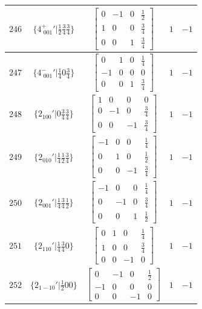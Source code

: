 \documentclass[fleqn,8pt]{jsarticle}
\begin{document}
\begin{longtable}{ccccc}
$ 246 $ & $ \{4^{+}_{\,\,001}{}'|\frac{1}{2} \frac{3}{4} \frac{3}{4}\} $ & $ \begin{bmatrix} 0 & -1 & 0 & \frac{1}{2} \\ 1 & 0 & 0 & \frac{3}{4} \\ 0 & 0 & 1 & \frac{3}{4} \end{bmatrix} $ & $ 1 $ & $ -1 $ \\ \hline
$ 247 $ & $ \{4^{-}_{\,\,001}{}'|\frac{1}{4} 0 \frac{3}{4}\} $ & $ \begin{bmatrix} 0 & 1 & 0 & \frac{1}{4} \\ -1 & 0 & 0 & 0 \\ 0 & 0 & 1 & \frac{3}{4} \end{bmatrix} $ & $ 1 $ & $ -1 $ \\ \hline
$ 248 $ & $ \{2{}_{100}{}'|0 \frac{3}{4} \frac{3}{4}\} $ & $ \begin{bmatrix} 1 & 0 & 0 & 0 \\ 0 & -1 & 0 & \frac{3}{4} \\ 0 & 0 & -1 & \frac{3}{4} \end{bmatrix} $ & $ 1 $ & $ -1 $ \\ \hline
$ 249 $ & $ \{2{}_{010}{}'|\frac{1}{4} \frac{1}{2} \frac{3}{4}\} $ & $ \begin{bmatrix} -1 & 0 & 0 & \frac{1}{4} \\ 0 & 1 & 0 & \frac{1}{2} \\ 0 & 0 & -1 & \frac{3}{4} \end{bmatrix} $ & $ 1 $ & $ -1 $ \\ \hline
$ 250 $ & $ \{2{}_{001}{}'|\frac{1}{4} \frac{3}{4} \frac{1}{2}\} $ & $ \begin{bmatrix} -1 & 0 & 0 & \frac{1}{4} \\ 0 & -1 & 0 & \frac{3}{4} \\ 0 & 0 & 1 & \frac{1}{2} \end{bmatrix} $ & $ 1 $ & $ -1 $ \\ \hline
$ 251 $ & $ \{2{}_{110}{}'|\frac{1}{4} \frac{3}{4} 0\} $ & $ \begin{bmatrix} 0 & 1 & 0 & \frac{1}{4} \\ 1 & 0 & 0 & \frac{3}{4} \\ 0 & 0 & -1 & 0 \end{bmatrix} $ & $ 1 $ & $ -1 $ \\ \hline
$ 252 $ & $ \{2{}_{1-10}{}'|\frac{1}{2} 0 0\} $ & $ \begin{bmatrix} 0 & -1 & 0 & \frac{1}{2} \\ -1 & 0 & 0 & 0 \\ 0 & 0 & -1 & 0 \end{bmatrix} $ & $ 1 $ & $ -1 $ \\ \hline

\end{longtable}
\end{document}
